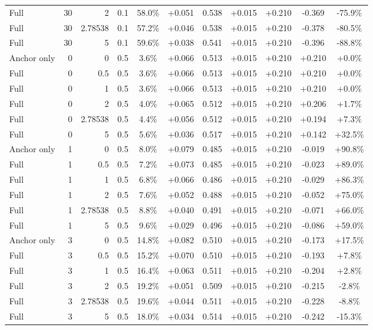 \begin{table}[htbp]
\begin{tabular}{lrrrccccccc}
Full & 30 & 2 & 0.1 & 58.0\% & +0.051 & 0.538 & +0.015 & +0.210 & -0.369 & -75.9\% \\
Full & 30 & 2.78538 & 0.1 & 57.2\% & +0.046 & 0.538 & +0.015 & +0.210 & -0.378 & -80.5\% \\
Full & 30 & 5 & 0.1 & 59.6\% & +0.038 & 0.541 & +0.015 & +0.210 & -0.396 & -88.8\% \\
Anchor only & 0 & 0 & 0.5 & 3.6\% & +0.066 & 0.513 & +0.015 & +0.210 & +0.210 & +0.0\% \\
Full & 0 & 0.5 & 0.5 & 3.6\% & +0.066 & 0.513 & +0.015 & +0.210 & +0.210 & +0.0\% \\
Full & 0 & 1 & 0.5 & 3.6\% & +0.066 & 0.513 & +0.015 & +0.210 & +0.210 & +0.0\% \\
Full & 0 & 2 & 0.5 & 4.0\% & +0.065 & 0.512 & +0.015 & +0.210 & +0.206 & +1.7\% \\
Full & 0 & 2.78538 & 0.5 & 4.4\% & +0.056 & 0.512 & +0.015 & +0.210 & +0.194 & +7.3\% \\
Full & 0 & 5 & 0.5 & 5.6\% & +0.036 & 0.517 & +0.015 & +0.210 & +0.142 & +32.5\% \\
Anchor only & 1 & 0 & 0.5 & 8.0\% & +0.079 & 0.485 & +0.015 & +0.210 & -0.019 & +90.8\% \\
Full & 1 & 0.5 & 0.5 & 7.2\% & +0.073 & 0.485 & +0.015 & +0.210 & -0.023 & +89.0\% \\
Full & 1 & 1 & 0.5 & 6.8\% & +0.066 & 0.486 & +0.015 & +0.210 & -0.029 & +86.3\% \\
Full & 1 & 2 & 0.5 & 7.6\% & +0.052 & 0.488 & +0.015 & +0.210 & -0.052 & +75.0\% \\
Full & 1 & 2.78538 & 0.5 & 8.8\% & +0.040 & 0.491 & +0.015 & +0.210 & -0.071 & +66.0\% \\
Full & 1 & 5 & 0.5 & 9.6\% & +0.029 & 0.496 & +0.015 & +0.210 & -0.086 & +59.0\% \\
Anchor only & 3 & 0 & 0.5 & 14.8\% & +0.082 & 0.510 & +0.015 & +0.210 & -0.173 & +17.5\% \\
Full & 3 & 0.5 & 0.5 & 15.2\% & +0.070 & 0.510 & +0.015 & +0.210 & -0.193 & +7.8\% \\
Full & 3 & 1 & 0.5 & 16.4\% & +0.063 & 0.511 & +0.015 & +0.210 & -0.204 & +2.8\% \\
Full & 3 & 2 & 0.5 & 19.2\% & +0.051 & 0.509 & +0.015 & +0.210 & -0.215 & -2.8\% \\
Full & 3 & 2.78538 & 0.5 & 19.6\% & +0.044 & 0.511 & +0.015 & +0.210 & -0.228 & -8.8\% \\
Full & 3 & 5 & 0.5 & 18.0\% & +0.034 & 0.514 & +0.015 & +0.210 & -0.242 & -15.3\% \\

\end{tabular}
\end{table}
